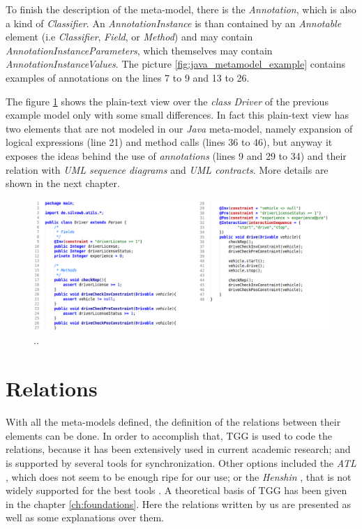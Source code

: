 \documentclass[tuberlin,cic,tc,english,noabntcite]{iiufrgs}
\begin{document}
To finish the description of the meta-model, there is the \emph{Annotation}, which is also a kind of \emph{Classifier}. An \emph{AnnotationInstance} is than contained by an \emph{Annotable} element (i.e \emph{Classifier}, \emph{Field}, or \emph{Method}) and may contain \emph{AnnotationInstanceParameters}, which themselves may contain \emph{AnnotationInstanceValues}. The picture \ref{fig:java_metamodel_example} contains examples of annotations on the lines 7 to 9 and 13 to 26.

The figure \ref{fig:java_metamodel_example_text01} shows the plain-text view over the \emph{class} \emph{Driver} of the previous example model only with some small differences. In fact this plain-text view has two elements that are not modeled in our \emph{Java} meta-model, namely expansion of logical expressions (line 21) and method calls (lines 36 to 46), but anyway it exposes the ideas behind the use of \emph{annotations} (lines 9 and 29 to 34) and their relation with \emph{UML sequence diagrams} and \emph{UML contracts}. More details are shown in the next chapter.

\begin{figure}[h]
    \caption{..}
    \begin{center}
        \includegraphics[width=\textwidth]{javaMetamodelExample01_Text}
    \end{center}
    \label{fig:java_metamodel_example_text01}
\end{figure}

\section{Relations}
With all the meta-models defined, the definition of the relations between their elements can be done. In order to accomplish that, TGG is used to code the relations, because it has been extensively used in current academic research; and is supported by several tools for synchronization. Other options included the \emph{ATL} \citep{jouault2008atl}, which does not seem to be enough ripe for our use; or the \emph{Henshin} \citep{arendt2010henshin}, that is not widely supported for the best tools \citep{hildebrandt2013survey}. A theoretical basis of TGG has been given in the chapter \ref{ch:foundations}. Here the relations written by us are presented as well as some explanations over them.
\end{document}

